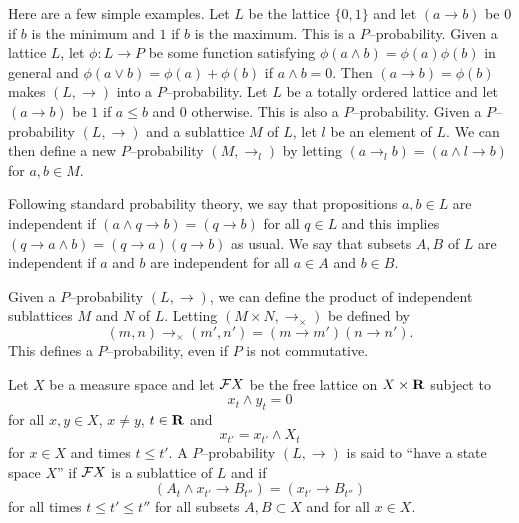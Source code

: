 \documentclass[12pt]{article}
\begin{document}
   Here are a few simple examples.
Let $L$ be the lattice $\{0,1\}$ and let $(a\rightarrow b)$ 
be $0$ if $b$ is the minimum and $1$ if $b$ is the maximum.  This 
is a $P$--probability.
   Given a lattice $L$, let $\phi:L\rightarrow P$ be some function satisfying 
$\phi(a\wedge b)=\phi(a)\phi(b)$
in general and $\phi(a\vee b)=\phi(a)+\phi(b)$ if $a\wedge b=0$.  Then $(a\rightarrow b)=\phi(b)$
makes $(L,\rightarrow)$ into a $P$--probability.  
   Let $L$ be a totally ordered lattice and let $(a\rightarrow b)$ be $1$ if 
$a\leq b$ and $0$ otherwise.  This is also a $P$--probability.  
   Given a $P$--probability $(L,\rightarrow)$ and a sublattice $M$ of $L$, 
let $l$ be an element of $L$.  We can then define a new $P$--probability $(M,\rightarrow_l)$
by letting $(a\rightarrow_l b)=(a\wedge l\rightarrow b)$ for $a,b\in M$.

   Following standard probability theory, we say that propositions $a,b\in L$
are independent if $(a\wedge q\rightarrow b)=(q\rightarrow b)$ for all $q\in L$
and this implies $(q\rightarrow a\wedge b)=(q\rightarrow a)(q\rightarrow b)$ 
as usual.
We say that subsets $A,B$ of $L$ are independent if $a$ and $b$ are independent
for all $a\in A$ and $b\in B$.

    Given a $P$--probability $(L,\rightarrow)$, we can 
define the product of independent sublattices $M$ and $N$ of $L$.  
Letting $(M\times N,\rightarrow_\times)$ be defined by 
\begin{equation}
(m,n)\rightarrow_\times(m',n') = (m\rightarrow m')(n\rightarrow n').
\end{equation}
This defines a $P$--probability, even if $P$ is not commutative.

    Let $X$ be a measure space and let ${\cal F}X$ be the free lattice on $X\times {\bf R}$
subject to
\begin{equation}
x_t\wedge y_t = 0
\end{equation}
for all $x,y\in X$, $x\neq y$, $t\in {\bf R}$ and 
\begin{equation}
x_{t'}=x_{t'}\wedge X_t
\end{equation}
for $x\in X$ and times $t\leq t'$.
A $P$--probability $(L,\rightarrow)$ is said to ``have a state space $X$'' if 
${\cal F}X$ is a sublattice of $L$ and if 
\begin{equation}
(A_t\wedge x_{t'}\rightarrow B_{t''})=(x_{t'}\rightarrow B_{t''})
\end{equation}
for all times $t\leq t'\leq t''$ for all subsets $A,B\subset X$ and for all $x\in X$.
\end{document}
